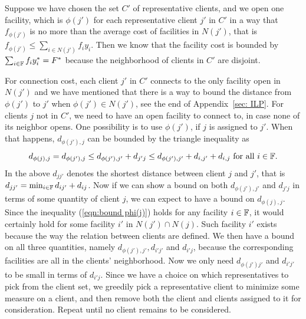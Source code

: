 \documentclass[oneside,final]{ucr}
\begin{document}
Suppose we have chosen the set $C'$ of representative
clients, and we open one facility, which is $\phi(j')$ for
each representative client $j'$ in $C'$ in a way that
$f_{\phi(j')}$ is no more than the average cost of
facilities in $N(j')$, that is $f_{\phi(j')} \leq \sum_{i\in
  N(j')} f_{i} y_{i}$. Then we know that the facility cost
is bounded by $\sum_{i\in \mathbb{F}} f_i y_i^\ast = F^\ast$
because the neighborhood of clients in $C'$ are disjoint.

For connection cost, each client $j'$ in $C'$ connects to
the only facility open in $N(j')$ and we have mentioned that
there is a way to bound the distance from $\phi(j')$ to $j'$
when $\phi(j') \in N(j')$, see the end of Appendix~\ref{sec:
  ILP}. For clients $j$ not in $C'$, we need to have an open
facility to connect to, in case none of its neighbor
opens. One possibility is to use $\phi(j')$, if $j$ is
assigned to $j'$. When that happens, $d_{\phi(j'), j}$ can
be bounded by the triangle inequality as
\begin{equation}
  \label{eqn:bound phi(j)}
  d_{\phi(j),j} = d_{\phi(j'), j} \leq d_{\phi(j'), j'} + d_{j'j} \leq
  d_{\phi(j'), j'} + d_{i,j'} + d_{i,j} \text{ for all } i
  \in \mathbb{F}.
\end{equation}
In the above $d_{jj'}$ denotes the shortest distance between
client $j$ and $j'$, that is $d_{jj'} = \min_{i\in\mathbb{F}}
d_{ij'} + d_{ij}$. Now if we can show a bound on both
$d_{\phi(j'),j'}$ and $d_{j'j}$ in terms of some quantity of
client $j$, we can expect to have a bound on
$d_{\phi(j),j}$. Since the inequality (\ref{eqn:bound
  phi(j)}) holds for any facility $i \in \mathbb{F}$, it
would certainly hold for some facility $i'$ in $N(j') \cap
N(j)$. Such facility $i'$ exists because the way the
relation between clients are defined. We then have a bound
on all three quantities, namely $d_{\phi(j'), j'}, d_{i'j'}$
and $d_{i'j}$, because the corresponding facilities are all
in the clients' neighborhood. Now we only need $d_{\phi(j')
  j'}$ and $d_{i'j'}$ to be small in terms of
$d_{i'j}$. Since we have a choice on which representatives
to pick from the client set, we greedily pick a
representative client to minimize some measure on a client,
and then remove both the client and clients assigned to it
for consideration. Repeat until no client remains to be
considered.
\end{document}
